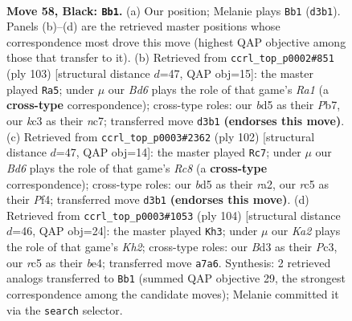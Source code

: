 \documentclass[11pt]{article}
\begin{document}
\clearpage

\begin{figure}[p]\centering
\begin{subfigure}{0.46\textwidth}\centering
\resizebox{\linewidth}{!}{%
\newchessgame
\chessboard[
  setfen={8/k4r2/4N3/2RB1p2/1P6/2Kb2N1/6P1/8 b - - 13 58},
  showmover=false,
  pgfstyle=straightmove, color=movearrow, markmove={d3-b1}
]}
\caption{}
\end{subfigure}\hfill
\begin{subfigure}{0.46\textwidth}\centering
\resizebox{\linewidth}{!}{%
\newchessgame
\chessboard[
  setfen={r7/1pN2k2/8/7p/2P5/pB4B1/K4Pb1/8 b - - 9 52},
  showmover=false,
  pgfstyle=straightmove, color=movearrow, markmove={a8-a5}
]}
\caption{}
\end{subfigure}
\\[4pt]
\begin{subfigure}{0.46\textwidth}\centering
\resizebox{\linewidth}{!}{%
\newchessgame
\chessboard[
  setfen={2R5/4nk2/2P3p1/p3B3/5P2/8/r7/2K5 w - - 7 52},
  showmover=false,
  pgfstyle=straightmove, color=movearrow, markmove={c8-c7}
]}
\caption{}
\end{subfigure}\hfill
\begin{subfigure}{0.46\textwidth}\centering
\resizebox{\linewidth}{!}{%
\newchessgame
\chessboard[
  setfen={8/8/8/3p2p1/3Bb1r1/2Pk4/5R1K/8 w - - 12 53},
  showmover=false,
  pgfstyle=straightmove, color=movearrow, markmove={h2-h3}
]}
\caption{}
\end{subfigure}
\caption{\textbf{Move 58, Black: \texttt{Bb1}.} (a) Our position; Melanie plays \texttt{Bb1} (\texttt{d3b1}). Panels (b)--(d) are the retrieved master positions whose correspondence most drove this move (highest QAP objective among those that transfer to it). (b) Retrieved from \texttt{ccrl\_top\_p0002\#851} (ply 103) [structural distance $d$=47, QAP obj=15]: the master played \texttt{Ra5}; under $\mu$ our \emph{Bd6} plays the role of that game's \emph{Ra1} (a \textbf{cross-type} correspondence); cross-type roles: our \emph{b}d5 as their \emph{P}b7, our \emph{k}c3 as their \emph{n}c7; transferred move \texttt{d3b1} \textbf{(endorses this move)}. (c) Retrieved from \texttt{ccrl\_top\_p0003\#2362} (ply 102) [structural distance $d$=47, QAP obj=14]: the master played \texttt{Rc7}; under $\mu$ our \emph{Bd6} plays the role of that game's \emph{Rc8} (a \textbf{cross-type} correspondence); cross-type roles: our \emph{b}d5 as their \emph{r}a2, our \emph{r}c5 as their \emph{P}f4; transferred move \texttt{d3b1} \textbf{(endorses this move)}. (d) Retrieved from \texttt{ccrl\_top\_p0003\#1053} (ply 104) [structural distance $d$=46, QAP obj=24]: the master played \texttt{Kh3}; under $\mu$ our \emph{Ka2} plays the role of that game's \emph{Kh2}; cross-type roles: our \emph{B}d3 as their \emph{P}c3, our \emph{r}c5 as their \emph{b}e4; transferred move \texttt{a7a6}. Synthesis: 2 retrieved analogs transferred to \texttt{Bb1} (summed QAP objective 29, the strongest correspondence among the candidate moves); Melanie committed it via the \texttt{search} selector.}
\label{fig:thought-m115}
\end{figure}
\end{document}
